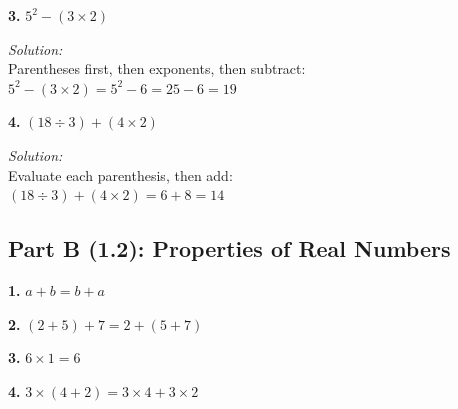 \documentclass[12pt]{article}
\begin{document}

                \vspace{0.5cm}

            \textbf{3.} $5^2 - (3 \times 2)$

                \textit{Solution:}\\
                Parentheses first, then exponents, then subtract:\\
                $5^2 - (3 \times 2) = 5^2 - 6 = 25 - 6 = 19$


                \vspace{0.5cm}

            \textbf{4.} $(18 \div 3) + (4 \times 2)$

                \textit{Solution:}\\
                Evaluate each parenthesis, then add:\\
                $(18 \div 3) + (4 \times 2) = 6 + 8 = 14$


                \newpage

        \subsection*{Part B (1.2): Properties of Real Numbers}

            \textbf{1.} $a + b = b + a$


                \vspace{0.5cm}

            \textbf{2.} $(2 + 5) + 7 = 2 + (5 + 7)$


                \vspace{0.5cm}

            \textbf{3.} $6 \times 1 = 6$


                \vspace{0.5cm}

            \textbf{4.} $3 \times (4 + 2) = 3 \times 4 + 3 \times 2$

\end{document}
